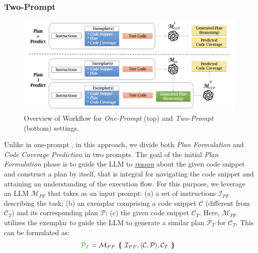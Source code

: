 %

%

\subsubsection{Two-Prompt {\cctool}}

\begin{figure}[t] 
    \centering
    \includegraphics[width=0.7\linewidth]{codepilot-overview.png}
    \vspace{-19pt}
    \caption{Overview of {\cctool} Workflow for \textit{One-Prompt} (top) and \textit{Two-Prompt} (bottom) settings.}
    \label{fig:codepilot}
\end{figure}

Unlike in one-prompt {\cctool}, in this approach, we divide both \textit{Plan Formulation} and \textit{Code Coverage Prediction} in two prompts. The goal of the initial \textit{Plan Formulation} phase is to guide the LLM to \underline{\textit{reason}} about the given code snippet and construct a plan by itself, that is integral for navigating the code snippet and attaining an understanding of the execution flow. For this purpose, we leverage an LLM $\mathcal{M}_{PF}$ that takes as an input prompt: (a) a set of instructions $\mathcal{I}_{PF}$ describing the task; (b) an exemplar comprising a code snippet $\mathcal{C}$ (different from $\mathcal{C}_T$) and its corresponding plan $\mathcal{P}$; (c) the given code snippet $\mathcal{C}_T$. 
Here, $\mathcal{M}_{PF}$ utilizes the exemplar to guide the LLM to generate a similar plan $\mathcal{P}_T$ for $\mathcal{C}_T$.
This can be formulated as:
\begin{equation}\label{form:f1}
\textcolor{dkgreen}{\mathcal{P}_T} = \mathcal{M}_{PF} \textbf{\ \{\ } \mathcal{I}_{PF}, \langle \mathcal{C}, \mathcal{P} \rangle, \mathcal{C}_T \textbf{\ \}\ }  
\end{equation}

